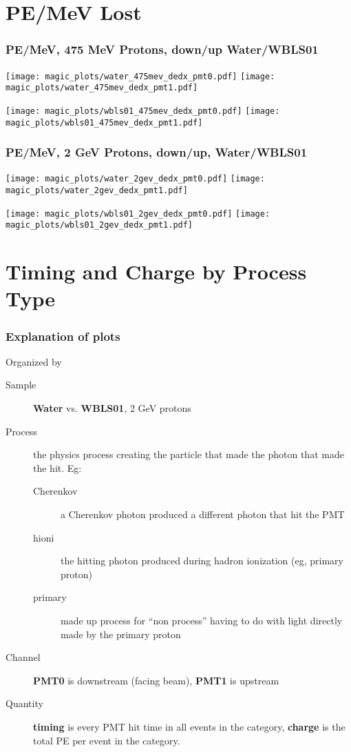 \documentclass[xcolor=dvipsnames]{beamer}
\begin{document}
\section{PE/MeV Lost}

\begin{frame}[fragile]
  \frametitle{PE/MeV, 475 MeV Protons, down/up Water/WBLS01}
  \texttt{[image: magic\_plots/water\_475mev\_dedx\_pmt0.pdf]}%
  \texttt{[image: magic\_plots/water\_475mev\_dedx\_pmt1.pdf]}

  \texttt{[image: magic\_plots/wbls01\_475mev\_dedx\_pmt0.pdf]}%
  \texttt{[image: magic\_plots/wbls01\_475mev\_dedx\_pmt1.pdf]}

\end{frame}

\begin{frame}[fragile]
  \frametitle{PE/MeV, 2 GeV Protons, down/up, Water/WBLS01}
  \texttt{[image: magic\_plots/water\_2gev\_dedx\_pmt0.pdf]}%
  \texttt{[image: magic\_plots/water\_2gev\_dedx\_pmt1.pdf]}

  \texttt{[image: magic\_plots/wbls01\_2gev\_dedx\_pmt0.pdf]}%
  \texttt{[image: magic\_plots/wbls01\_2gev\_dedx\_pmt1.pdf]}
\end{frame}


\section{Timing and Charge by Process Type}

\begin{frame}
  \frametitle{Explanation of plots}
  Organized by 
  \begin{description}
  \item[Sample] \textbf{Water} vs. \textbf{WBLS01}, 2 GeV protons
  \item[Process] the physics process creating the particle that made
    the photon that made the hit.  Eg:
    \begin{description}
    \item[Cherenkov] a Cherenkov photon produced a different photon that hit the PMT
    \item[hioni] the hitting photon produced during hadron ionization (eg, primary proton)
    \item[primary] made up process for ``non process'' having to do with light directly made by the primary proton
    \end{description}
  \item[Channel] \textbf{PMT0} is downstream (facing beam), \textbf{PMT1} is upstream
  \item[Quantity] \textbf{timing} is every PMT hit time in all events in the category, \textbf{charge} is the total PE per event in the category.
  \end{description}
\end{frame}
\end{document}
